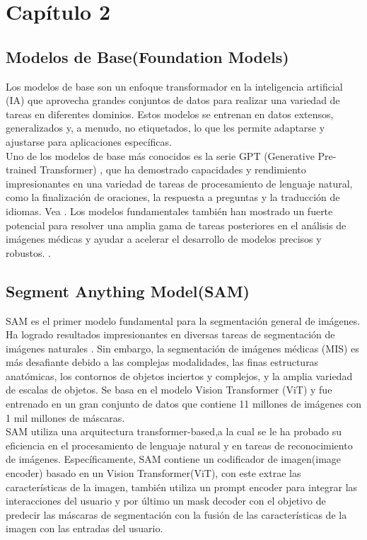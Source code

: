 \documentclass[12pt]{article}
\begin{document}
		
	
	
	\newpage
	
	\section{Cap\'itulo 2}
	
		\subsection{Modelos de Base(Foundation Models)}
		Los modelos de base son un enfoque transformador en la inteligencia artificial (IA) que aprovecha grandes conjuntos de datos para realizar una variedad de tareas en diferentes dominios. Estos modelos se entrenan en datos extensos, generalizados y, a menudo, no etiquetados, lo que les permite adaptarse y ajustarse para aplicaciones específicas. 
		\\
		Uno de los modelos de base más conocidos es la serie GPT (Generative Pre-trained Transformer) \cite{Brown2020LanguageModels,OpenAI2023GPT4}, que ha demostrado capacidades y rendimiento impresionantes en una variedad de tareas de procesamiento de lenguaje natural, como la finalización de oraciones, la respuesta a preguntas y la traducción de idiomas. Vea \cite{Zhang2024SegmentAnything}.
		Los modelos fundamentales también han mostrado un fuerte potencial para resolver una amplia gama de tareas posteriores en el análisis de imágenes médicas y ayudar a acelerar el desarrollo de modelos precisos y robustos. \cite{Zhang2024SegmentAnything}.
		
		\subsection{Segment Anything Model(SAM)}
		SAM es el primer modelo fundamental para la segmentación general de imágenes. Ha logrado resultados impresionantes en diversas tareas de segmentación de imágenes naturales \parencite{Huang2024}. Sin embargo, la segmentación de imágenes médicas (MIS) es más desafiante debido a las complejas modalidades, las finas estructuras anatómicas, los contornos de objetos inciertos y complejos, y la amplia variedad de escalas de objetos. Se basa en el modelo Vision Transformer (ViT) y fue entrenado en un gran conjunto de datos que contiene 11 millones de imágenes con 1 mil millones de máscaras.
		\\
		
		SAM utiliza una arquitectura transformer-based,a la cual se le ha probado su eficiencia en el procesamiento de lenguaje natural y en tareas de reconocimiento de im\'agenes. Espec\'ificamente, SAM contiene un codificador de imagen(image encoder) basado en un Vision Transformer(ViT), con este extrae las caracter\'isticas de la imagen, tambi\'en utiliza un prompt encoder para integrar las interacciones del usuario y por \'ultimo un mask decoder con el objetivo de predecir las m\'ascaras de segmentaci\'on con la fusi\'on de las caracter\'isticas de la imagen con las entradas del usuario.
		\\
		
\end{document}
